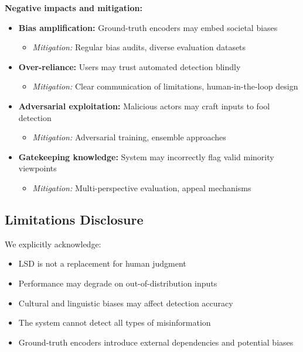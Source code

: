 \documentclass[11pt]{article}
\begin{document}
\textbf{Negative impacts and mitigation:}
\begin{itemize}[leftmargin=*]
    \item \textbf{Bias amplification:} Ground-truth encoders may embed societal biases
    \begin{itemize}
        \item \textit{Mitigation:} Regular bias audits, diverse evaluation datasets
    \end{itemize}
    \item \textbf{Over-reliance:} Users may trust automated detection blindly
    \begin{itemize}
        \item \textit{Mitigation:} Clear communication of limitations, human-in-the-loop design
    \end{itemize}
    \item \textbf{Adversarial exploitation:} Malicious actors may craft inputs to fool detection
    \begin{itemize}
        \item \textit{Mitigation:} Adversarial training, ensemble approaches
    \end{itemize}
    \item \textbf{Gatekeeping knowledge:} System may incorrectly flag valid minority viewpoints
    \begin{itemize}
        \item \textit{Mitigation:} Multi-perspective evaluation, appeal mechanisms
    \end{itemize}
\end{itemize}

\subsection{Limitations Disclosure}

We explicitly acknowledge:
\begin{itemize}[leftmargin=*]
    \item LSD is not a replacement for human judgment
    \item Performance may degrade on out-of-distribution inputs
    \item Cultural and linguistic biases may affect detection accuracy
    \item The system cannot detect all types of misinformation
    \item Ground-truth encoders introduce external dependencies and potential biases
\end{itemize}
\end{document}
